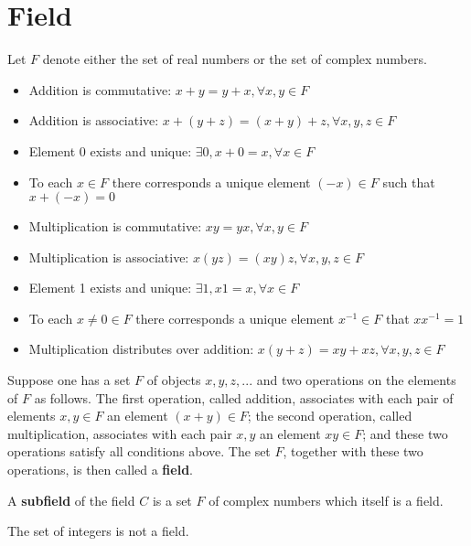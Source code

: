 		\section{Field}
			\begin{definition}[Field]
				Let $F$ denote either the set  of real numbers or the set of complex numbers.
				\begin{itemize}
					\item Addition is commutative: $x + y = y + x, \forall x, y \in F$
					\item Addition is associative: $x + (y + z) = (x + y) + z, \forall x, y, z \in F$
					\item Element 0 exists and unique: $\exists 0, x + 0 = x, \forall x \in F$
					\item To each $x \in F$ there corresponds a unique element $(-x) \in F$ such that $x + (-x) = 0$
					\item Multiplication is commutative: $xy = yx, \forall x, y \in F$
					\item Multiplication is associative: $x(yz) = (xy)z, \forall x, y, z \in F$
					\item Element 1 exists and unique: $\exists 1, x1=x, \forall x \in F$
					\item To each $x\neq 0 \in F$ there corresponds a unique element $x^{-1} \in F$ that $xx^{-1} = 1$
					\item Multiplication distributes over addition: $x(y + z) = xy + xz, \forall x, y, z \in F$
				\end{itemize}
				Suppose one has a set $F$ of objects $x, y, z, ...$ and two operations on the elements of $F$ as follows. The first operation, called addition, associates with each pair of elements $x, y \in F$ an element $(x + y)\in F$; the second operation, called multiplication, associates with each pair $x, y$ an element $xy \in F$; and these two operations satisfy all conditions above. The set $F$, together with these two operations, is then called a \textbf{field}.
			\end{definition}

			\begin{definition}[Subfield]
				A \textbf{subfield} of the field $C$ is a set $F$ of complex numbers which itself is a field.
			\end{definition}

			\begin{example}
				The set of integers is not a field.
			\end{example}

